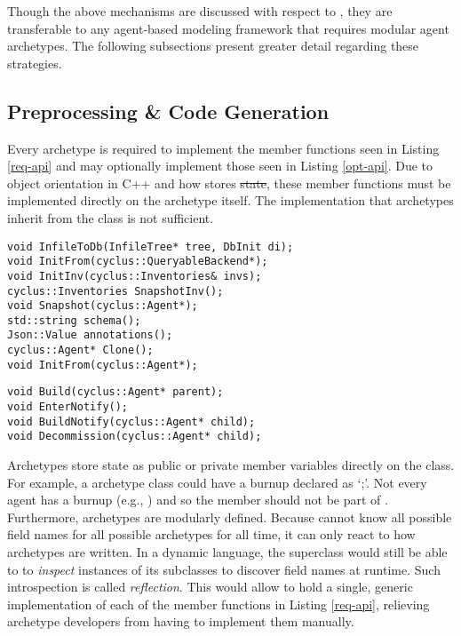 Though the above mechanisms are discussed with respect to \cyclus, they are 
transferable to any agent-based modeling framework that requires modular agent 
archetypes. The following subsections present greater detail regarding these 
strategies.

\subsection{Preprocessing \& Code Generation}
\label{subsec-ppgc}

Every \cyclus archetype is required to implement the member functions 
seen in Listing \ref{req-api} and may optionally implement those seen in 
Listing \ref{opt-api}. Due to object orientation in 
C++ and how \cyclus stores \sout{state}, these member functions must be implemented directly
on the archetype itself. The implementation that archetypes inherit 
from the  class is not sufficient. 

\begin{lstlisting}[caption={Required Archetype API}, label=req-api]
void InfileToDb(InfileTree* tree, DbInit di);
void InitFrom(cyclus::QueryableBackend*);
void InitInv(cyclus::Inventories& invs);
cyclus::Inventories SnapshotInv();
void Snapshot(cyclus::Agent*);
std::string schema();
Json::Value annotations();
cyclus::Agent* Clone();
void InitFrom(cyclus::Agent*);
\end{lstlisting}

\begin{lstlisting}[caption={Optional Archetype API}, label=opt-api]
void Build(cyclus::Agent* parent);
void EnterNotify();
void BuildNotify(cyclus::Agent* child);
void Decommission(cyclus::Agent* child);
\end{lstlisting}

Archetypes store state as public or private member variables
directly on the class.  For example, a  archetype class
could have a burnup declared as `;'. Not every agent has 
a burnup (e.g., ) and so the  member 
should not be part of . Furthermore, archetypes are modularly 
defined. Because \cyclus cannot know all possible field names 
for all possible archetypes for all time, it can only react to how 
archetypes are written. In a dynamic language, the 
superclass would still be able to to \emph{inspect} instances of its subclasses
to discover field names at runtime. Such introspection is called \emph{reflection}. 
This would allow  to hold a single, generic implementation of each of the
member functions in Listing \ref{req-api}, relieving archetype developers from 
having to implement them manually.

